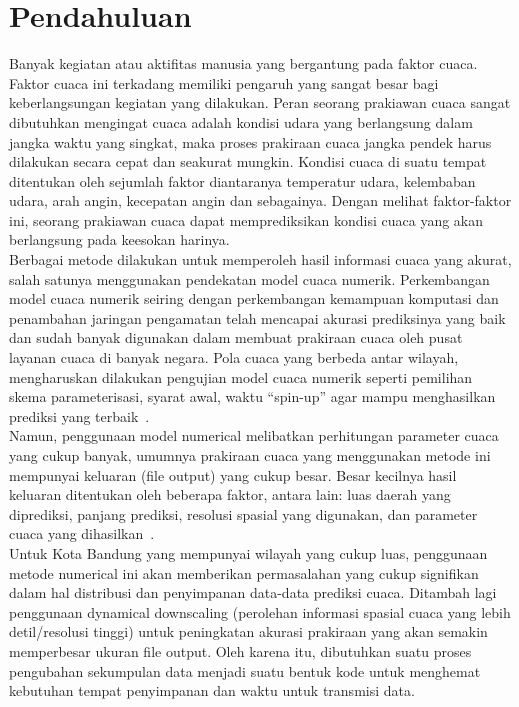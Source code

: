 \documentclass[journal]{IEEEtran}
\begin{document}
\section{Pendahuluan}
\hspace*{0.3cm}Banyak kegiatan atau aktifitas manusia yang bergantung pada faktor cuaca. Faktor cuaca ini terkadang memiliki pengaruh yang sangat besar bagi keberlangsungan kegiatan yang dilakukan. Peran seorang prakiawan cuaca sangat dibutuhkan mengingat cuaca adalah kondisi udara yang berlangsung dalam jangka waktu yang singkat, maka proses prakiraan cuaca jangka pendek harus dilakukan secara cepat dan seakurat mungkin. Kondisi cuaca di suatu tempat ditentukan oleh sejumlah faktor diantaranya temperatur udara, kelembaban udara, arah angin, kecepatan angin dan sebagainya. Dengan melihat faktor-faktor ini, seorang prakiawan cuaca dapat memprediksikan kondisi cuaca yang akan berlangsung pada keesokan harinya.\\
\hspace*{0.6cm}Berbagai metode dilakukan untuk memperoleh hasil informasi cuaca yang akurat, salah satunya menggunakan pendekatan model cuaca numerik. Perkembangan model cuaca numerik seiring dengan perkembangan kemampuan komputasi dan penambahan jaringan pengamatan telah mencapai akurasi prediksinya yang baik dan sudah banyak digunakan dalam membuat prakiraan cuaca oleh pusat layanan cuaca di banyak negara. Pola cuaca yang berbeda antar wilayah, mengharuskan dilakukan pengujian model cuaca numerik seperti pemilihan skema parameterisasi, syarat awal, waktu “spin-up” agar mampu menghasilkan prediksi yang terbaik~\cite{1}.\\
\hspace*{0.6cm}Namun, penggunaan model numerical melibatkan perhitungan parameter cuaca yang cukup banyak, umumnya prakiraan cuaca yang menggunakan metode ini mempunyai keluaran (file output) yang cukup besar. Besar kecilnya hasil keluaran ditentukan oleh beberapa faktor, antara lain: luas daerah yang diprediksi, panjang prediksi, resolusi spasial yang digunakan, dan parameter cuaca yang dihasilkan~\cite{2}.\\
\hspace*{0.6cm}Untuk Kota Bandung yang mempunyai wilayah yang cukup luas, penggunaan metode numerical ini akan memberikan permasalahan yang cukup signifikan dalam hal distribusi dan penyimpanan data-data prediksi cuaca. Ditambah lagi penggunaan dynamical downscaling (perolehan informasi spasial cuaca yang lebih detil/resolusi tinggi) untuk peningkatan akurasi prakiraan yang akan semakin memperbesar ukuran file output. Oleh karena itu, dibutuhkan suatu proses pengubahan sekumpulan data menjadi suatu bentuk kode untuk menghemat kebutuhan tempat penyimpanan dan waktu untuk transmisi data.\\
\end{document}
